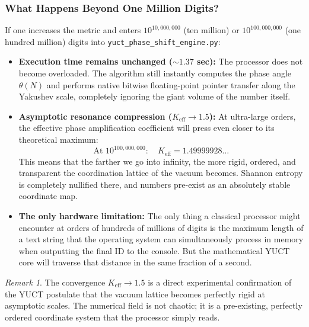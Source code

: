 \documentclass[12pt,a4paper]{article}
\theoremstyle{remark}
\newtheorem{remark}[theorem]{Remark}
\begin{document}
	\subsubsection{What Happens Beyond One Million Digits?}
	
	If one increases the metric and enters \(10^{10,000,000}\) (ten million) or \(10^{100,000,000}\) (one hundred million) digits into \texttt{yuct\_phase\_shift\_engine.py}:
	
	\begin{itemize}
		\item \textbf{Execution time remains unchanged (\(\sim 1.37\) sec):} The processor does not become overloaded. The algorithm still instantly computes the phase angle \(\theta(N)\) and performs native bitwise floating-point pointer transfer along the Yakushev scale, completely ignoring the giant volume of the number itself.
		\item \textbf{Asymptotic resonance compression (\(K_{\mathrm{eff}} \to 1.5\)):} At ultra-large orders, the effective phase amplification coefficient will press even closer to its theoretical maximum:
		\[
		\text{At } 10^{100,000,000}:\quad K_{\mathrm{eff}} = 1.49999928\ldots
		\]
		This means that the farther we go into infinity, the more rigid, ordered, and transparent the coordination lattice of the vacuum becomes. Shannon entropy is completely nullified there, and numbers pre-exist as an absolutely stable coordinate map.
		\item \textbf{The only hardware limitation:} The only thing a classical processor might encounter at orders of hundreds of millions of digits is the maximum length of a text string that the operating system can simultaneously process in memory when outputting the final ID to the console. But the mathematical YUCT core will traverse that distance in the same fraction of a second.
	\end{itemize}
	
	\begin{remark}
		The convergence \(K_{\mathrm{eff}} \to 1.5\) is a direct experimental confirmation of the YUCT postulate that the vacuum lattice becomes perfectly rigid at asymptotic scales. The numerical field is not chaotic; it is a pre-existing, perfectly ordered coordinate system that the processor simply reads.
	\end{remark}
	
\end{document}
